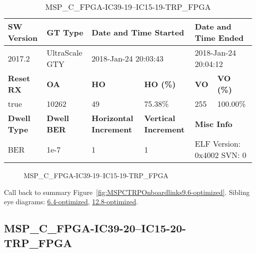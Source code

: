 \begin{table}[h]
\centering
\caption{MSP\_C\_FPGA-IC39-19--IC15-19-TRP\_FPGA}
\label{tab:MSPCFPGAIC3919IC1519TRPFPGA9.6-optimized}
\begin{tabular}{@{}|l|l|l|l|l|l|@{}}
\toprule
\textbf{SW Version}                & \textbf{GT Type}   & \multicolumn{2}{l|}{\textbf{Date and Time Started}}            & \multicolumn{2}{l|}{\textbf{Date and Time Ended}}        \\ \midrule
2017.2                       & UltraScale GTY          & \multicolumn{2}{l|}{2018-Jan-24 20:03:43}                   & \multicolumn{2}{l|}{2018-Jan-24 20:04:12}               \\ \midrule
\textbf{Reset RX}                  & \textbf{OA} & \textbf{HO}   & \textbf{HO (\%)} & \textbf{VO} & \textbf{VO (\%)} \\ \midrule
true & 10262        & 49          & 75.38\%        & 255        & 100.00\%       \\ \midrule
\textbf{Dwell Type}                & \textbf{Dwell BER} & \textbf{Horizontal Increment} & \textbf{Vertical Increment}    & \multicolumn{2}{l|}{\textbf{Misc Info}}                  \\ \midrule
BER                            & 1e-7        & 1        & 1           & \multicolumn{2}{l|}{ELF Version: 0x4002 SVN: 0}                         \\ \bottomrule
\end{tabular}
\end{table}

\begin{figure}[h]
\caption{MSP\_C\_FPGA-IC39-19--IC15-19-TRP\_FPGA} \label{fig:MSPCFPGAIC3919IC1519TRPFPGA9.6-optimized}
\end{figure}

Call back to summary Figure~\ref{fig:MSPCTRPOnboardlinks9.6-optimized}.
Sibling eye diagrams: \hyperref[sec:MSPCFPGAIC3919IC1519TRPFPGA6.4-optimized]{6.4-optimized}, \hyperref[sec:MSPCFPGAIC3919IC1519TRPFPGA12.8-optimized]{12.8-optimized}.

\clearpage
\newpage


\subsection{MSP\_C\_FPGA-IC39-20--IC15-20-TRP\_FPGA}\label{sec:MSPCFPGAIC3920IC1520TRPFPGA9.6-optimized}

